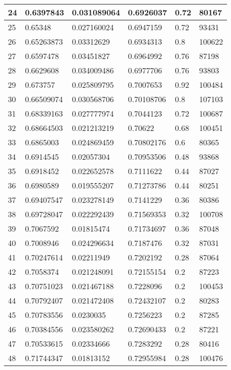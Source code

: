 \begin{longtable}{|l|l|l|l|l|l|}
24 & 0.6397843 & 0.031089064 & 0.6926037 & 0.72 & 80167 \\ \hline 
25 & 0.65348 & 0.027160024 & 0.6947159 & 0.72 & 93431 \\ \hline 
26 & 0.65263873 & 0.03312629 & 0.6934313 & 0.8 & 100622 \\ \hline 
27 & 0.6597478 & 0.03451827 & 0.6964992 & 0.76 & 87198 \\ \hline 
28 & 0.6629608 & 0.034009486 & 0.6977706 & 0.76 & 93803 \\ \hline 
29 & 0.673757 & 0.025809795 & 0.7007653 & 0.92 & 100484 \\ \hline 
30 & 0.66509074 & 0.030568706 & 0.70108706 & 0.8 & 107103 \\ \hline 
31 & 0.68339163 & 0.027777974 & 0.7044123 & 0.72 & 100687 \\ \hline 
32 & 0.68664503 & 0.021213219 & 0.70622 & 0.68 & 100451 \\ \hline 
33 & 0.6865003 & 0.024869459 & 0.70802176 & 0.6 & 80365 \\ \hline 
34 & 0.6914545 & 0.02057304 & 0.70953506 & 0.48 & 93868 \\ \hline 
35 & 0.6918452 & 0.022652578 & 0.7111622 & 0.44 & 87027 \\ \hline 
36 & 0.6980589 & 0.019555207 & 0.71273786 & 0.44 & 80251 \\ \hline 
37 & 0.69407547 & 0.023278149 & 0.7141229 & 0.36 & 80386 \\ \hline 
38 & 0.69728047 & 0.022292439 & 0.71569353 & 0.32 & 100708 \\ \hline 
39 & 0.7067592 & 0.01815474 & 0.71734697 & 0.36 & 87048 \\ \hline 
40 & 0.7008946 & 0.024296634 & 0.7187476 & 0.32 & 87031 \\ \hline 
41 & 0.70247614 & 0.02211949 & 0.7202192 & 0.28 & 87064 \\ \hline 
42 & 0.7058374 & 0.021248091 & 0.72155154 & 0.2 & 87223 \\ \hline 
43 & 0.70751023 & 0.021467188 & 0.7228096 & 0.2 & 100453 \\ \hline 
44 & 0.70792407 & 0.021472408 & 0.72432107 & 0.2 & 80283 \\ \hline 
45 & 0.70783556 & 0.0230035 & 0.7256223 & 0.2 & 87285 \\ \hline 
46 & 0.70384556 & 0.023580262 & 0.72690433 & 0.2 & 87221 \\ \hline 
47 & 0.70533615 & 0.02334666 & 0.7283292 & 0.28 & 80416 \\ \hline 
48 & 0.71744347 & 0.01813152 & 0.72955984 & 0.28 & 100476 \\ \hline 

\end{longtable}
